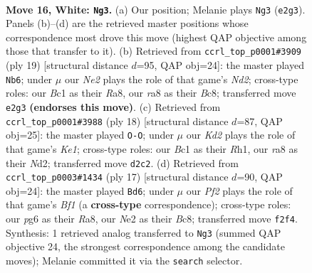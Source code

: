 \documentclass[11pt]{article}
\begin{document}
\clearpage

\begin{figure}[p]\centering
\begin{subfigure}{0.46\textwidth}\centering
\resizebox{\linewidth}{!}{%
\newchessgame
\chessboard[
  setfen={r1b2kr1/1p1qbp1p/p5p1/2Ppn2n/8/1N6/PP1KNPPP/1RBQ1B1R w - - 0 16},
  showmover=false,
  pgfstyle=straightmove, color=movearrow, markmove={e2-g3}
]}
\caption{}
\end{subfigure}\hfill
\begin{subfigure}{0.46\textwidth}\centering
\resizebox{\linewidth}{!}{%
\newchessgame
\chessboard[
  setfen={r1bqkb1r/1p1n1ppp/p3pn2/8/P1NN4/3BP3/1PQ2PPP/R1B1K2R b KQkq - 0 10},
  showmover=false,
  pgfstyle=straightmove, color=movearrow, markmove={d7-b6}
]}
\caption{}
\end{subfigure}
\\[4pt]
\begin{subfigure}{0.46\textwidth}\centering
\resizebox{\linewidth}{!}{%
\newchessgame
\chessboard[
  setfen={rnbqr1k1/ppp1bppp/3p1n2/8/1PPNP3/P7/3NBPPP/R1BQK2R w KQ - 1 10},
  showmover=false,
  pgfstyle=straightmove, color=movearrow, markmove={e1-g1}
]}
\caption{}
\end{subfigure}\hfill
\begin{subfigure}{0.46\textwidth}\centering
\resizebox{\linewidth}{!}{%
\newchessgame
\chessboard[
  setfen={r1bqkb1r/p2n1ppp/5n2/1PpP4/8/5P2/PPN3PP/RNBQKB1R b KQkq - 0 9},
  showmover=false,
  pgfstyle=straightmove, color=movearrow, markmove={f8-d6}
]}
\caption{}
\end{subfigure}
\caption{\textbf{Move 16, White: \texttt{Ng3}.} (a) Our position; Melanie plays \texttt{Ng3} (\texttt{e2g3}). Panels (b)--(d) are the retrieved master positions whose correspondence most drove this move (highest QAP objective among those that transfer to it). (b) Retrieved from \texttt{ccrl\_top\_p0001\#3909} (ply 19) [structural distance $d$=95, QAP obj=24]: the master played \texttt{Nb6}; under $\mu$ our \emph{Ne2} plays the role of that game's \emph{Nd2}; cross-type roles: our \emph{B}c1 as their \emph{R}a8, our \emph{r}a8 as their \emph{B}c8; transferred move \texttt{e2g3} \textbf{(endorses this move)}. (c) Retrieved from \texttt{ccrl\_top\_p0001\#3988} (ply 18) [structural distance $d$=87, QAP obj=25]: the master played \texttt{O-O}; under $\mu$ our \emph{Kd2} plays the role of that game's \emph{Ke1}; cross-type roles: our \emph{B}c1 as their \emph{R}h1, our \emph{r}a8 as their \emph{N}d2; transferred move \texttt{d2c2}. (d) Retrieved from \texttt{ccrl\_top\_p0003\#1434} (ply 17) [structural distance $d$=90, QAP obj=24]: the master played \texttt{Bd6}; under $\mu$ our \emph{Pf2} plays the role of that game's \emph{Bf1} (a \textbf{cross-type} correspondence); cross-type roles: our \emph{p}g6 as their \emph{R}a8, our \emph{N}e2 as their \emph{B}c8; transferred move \texttt{f2f4}. Synthesis: 1 retrieved analog transferred to \texttt{Ng3} (summed QAP objective 24, the strongest correspondence among the candidate moves); Melanie committed it via the \texttt{search} selector.}
\label{fig:thought-m30}
\end{figure}
\end{document}
